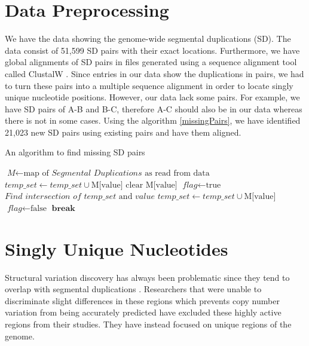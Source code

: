 \section{Data Preprocessing}
We have the data showing the genome-wide segmental duplications (SD). The data consist of 51,599 SD pairs with their exact locations. Furthermore, we have global alignments of SD pairs in files generated using a sequence alignment tool called ClustalW \cite{thompson1994clustal}. Since entries in our data show the duplications in pairs, we had to turn these pairs into a multiple sequence alignment in order to locate singly unique nucleotide positions. However, our data lack some pairs. For example, we have SD pairs of A-B and B-C, therefore A-C should also be in our data whereas there is not in some cases. Using the algorithm \ref{missingPairs}, we have identified 21,023 new SD pairs using existing pairs and have them aligned.

\begin{algorithm}
\caption{An algorithm to find missing SD pairs}
\label{missingPairs}
\begin{algorithmic}[1]
\State $\textit{M} \gets \text{map of }\textit{Segmental Duplications}\text{ as read from data}$
\State $\textit{temp\_set} \gets \textit{temp\_set} \cup \text{M{[value]}}$
\State $\text{clear M{[value]}}$
\EndFor
{}
\State $\textit{flag} \gets \text{true}$
\State $\textit{Find intersection of }\textit{temp\_set}\text{ and }\textit{value}$
\State $\textit{temp\_set} \gets \textit{temp\_set} \cup \text{M{[value]}}$
\State $\textit{flag} \gets \text{false}$
\EndIf
\EndFor
{}
\State $\textbf{break}$
\EndIf
\EndWhile
\EndFor
\EndProcedure
\end{algorithmic}
\end{algorithm}

\section{Singly Unique Nucleotides} \label{section:sun}
Structural variation discovery has always been problematic since they tend to overlap with segmental duplications \cite{sudmant2010diversity}. Researchers that were unable to discriminate slight differences in these regions which prevents copy number variation from being accurately predicted have excluded these highly active regions from their studies. They have instead focused on unique regions of the genome.

